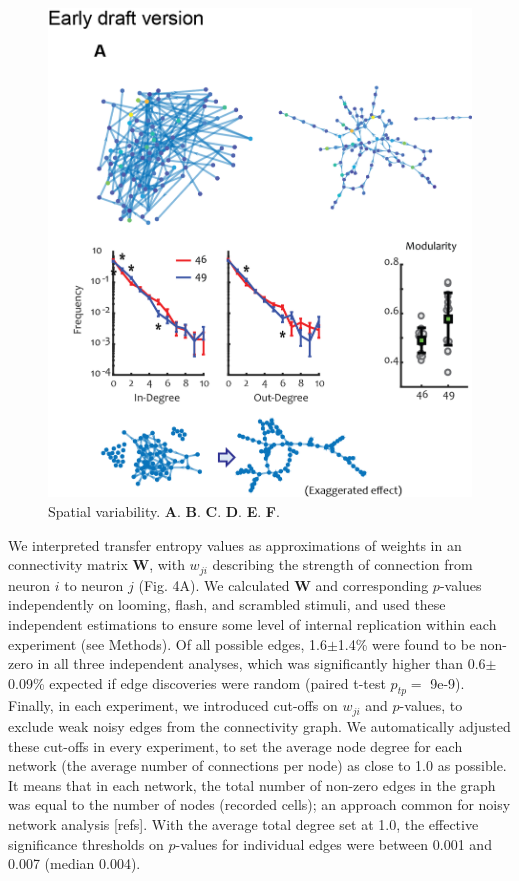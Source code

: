 \documentclass{article}
\begin{document}
\begin{figure}[t]
\includegraphics[width=0.5\linewidth]{fig4.png}
\caption{
Spatial variability. \textbf{A}. \textbf{B}. \textbf{C}. \textbf{D}. \textbf{E}. \textbf{F}. }
\end{figure}

We interpreted transfer entropy values as approximations of weights in an connectivity matrix $\textbf{W}$, with $w_{ji}$ describing the strength of connection from neuron $i$ to neuron $j$ (Fig. 4A). We calculated $\textbf{W}$ and corresponding $p$-values independently on looming, flash, and scrambled stimuli, and used these independent estimations to ensure some level of internal replication within each experiment (see Methods). Of all possible edges, 1.6$\pm$1.4\% were found to be non-zero in all three independent analyses, which was significantly higher than 0.6$\pm$0.09\% expected if edge discoveries were random (paired t-test $p_{tp}=$ 9e-9). Finally, in each experiment, we introduced cut-offs on $w_{ji}$ and $p$-values, to exclude weak noisy edges from the connectivity graph. We automatically adjusted these cut-offs in every experiment, to set the average node degree for each network (the average number of connections per node) as close to 1.0 as possible. It means that in each network, the total number of non-zero edges in the graph was equal to the number of nodes (recorded cells); an approach common for noisy network analysis \citep{stetter2012te}[refs]. With the average total degree set at 1.0, the effective significance thresholds on $p$-values for individual edges were between 0.001 and 0.007 (median 0.004).
\end{document}
